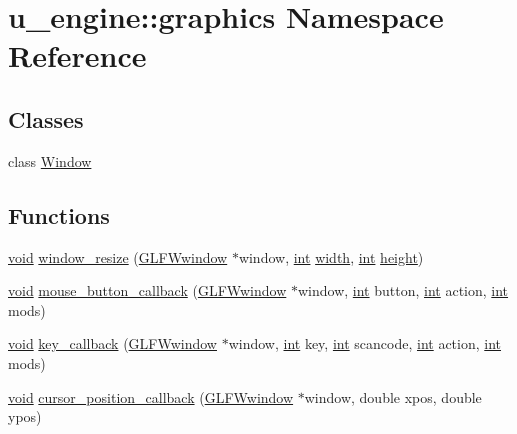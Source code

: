 \hypertarget{namespaceu__engine_1_1graphics}{}\section{u\+\_\+engine\+:\+:graphics Namespace Reference}
\label{namespaceu__engine_1_1graphics}
\subsection*{Classes}
\begin{DoxyCompactItemize}
\item 
class \hyperlink{classu__engine_1_1graphics_1_1_window}{Window}
\end{DoxyCompactItemize}
\subsection*{Functions}
\begin{DoxyCompactItemize}
\item 
\hyperlink{wglew_8h_aeea6e3dfae3acf232096f57d2d57f084}{void} \hyperlink{namespaceu__engine_1_1graphics_ae4afea9df23f60dfcd44f6a587ecdf95}{window\+\_\+resize} (\hyperlink{group__window_ga3c96d80d363e67d13a41b5d1821f3242}{G\+L\+F\+Wwindow} $\ast$window, \hyperlink{wglew_8h_a500a82aecba06f4550f6849b8099ca21}{int} \hyperlink{glew_8h_aa105b18f96e6bc2485cb7f576a7fb9ba}{width}, \hyperlink{wglew_8h_a500a82aecba06f4550f6849b8099ca21}{int} \hyperlink{glew_8h_aa214bd63e12f7ddf524c83894fcc69a7}{height})
\item 
\hyperlink{wglew_8h_aeea6e3dfae3acf232096f57d2d57f084}{void} \hyperlink{namespaceu__engine_1_1graphics_ac31e754896e2a053b38cf3cc842ef3ec}{mouse\+\_\+button\+\_\+callback} (\hyperlink{group__window_ga3c96d80d363e67d13a41b5d1821f3242}{G\+L\+F\+Wwindow} $\ast$window, \hyperlink{wglew_8h_a500a82aecba06f4550f6849b8099ca21}{int} button, \hyperlink{wglew_8h_a500a82aecba06f4550f6849b8099ca21}{int} action, \hyperlink{wglew_8h_a500a82aecba06f4550f6849b8099ca21}{int} mods)
\item 
\hyperlink{wglew_8h_aeea6e3dfae3acf232096f57d2d57f084}{void} \hyperlink{namespaceu__engine_1_1graphics_ac676971bc941d55fd95cc6da0041a878}{key\+\_\+callback} (\hyperlink{group__window_ga3c96d80d363e67d13a41b5d1821f3242}{G\+L\+F\+Wwindow} $\ast$window, \hyperlink{wglew_8h_a500a82aecba06f4550f6849b8099ca21}{int} key, \hyperlink{wglew_8h_a500a82aecba06f4550f6849b8099ca21}{int} scancode, \hyperlink{wglew_8h_a500a82aecba06f4550f6849b8099ca21}{int} action, \hyperlink{wglew_8h_a500a82aecba06f4550f6849b8099ca21}{int} mods)
\item 
\hyperlink{wglew_8h_aeea6e3dfae3acf232096f57d2d57f084}{void} \hyperlink{namespaceu__engine_1_1graphics_adee435291af6de6077aaffaf9b07f57c}{cursor\+\_\+position\+\_\+callback} (\hyperlink{group__window_ga3c96d80d363e67d13a41b5d1821f3242}{G\+L\+F\+Wwindow} $\ast$window, double xpos, double ypos)
\end{DoxyCompactItemize}


